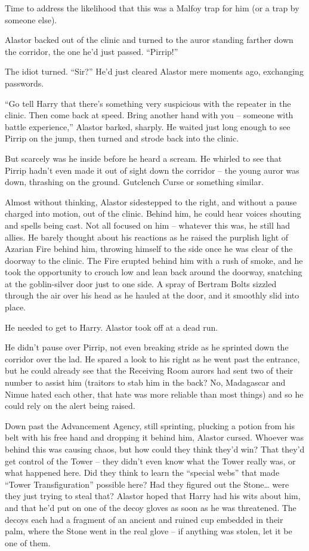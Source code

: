 Time to address the likelihood that this was a Malfoy trap for him (or a
trap by someone else).

Alastor backed out of the clinic and turned to the auror standing
farther down the corridor, the one he'd just passed. ``Pirrip!''

The idiot turned. ``Sir?'' He'd just cleared Alastor mere moments ago,
exchanging passwords.

``Go tell Harry that there's something very suspicious with the repeater
in the clinic. Then come back at speed. Bring another hand with you --
someone with battle experience,'' Alastor barked, sharply. He waited
just long enough to see Pirrip on the jump, then turned and strode back
into the clinic.

But scarcely was he inside before he heard a scream. He whirled to see
that Pirrip hadn't even made it out of sight down the corridor -- the
young auror was down, thrashing on the ground. Gutclench Curse or
something similar.

Almost without thinking, Alastor sidestepped to the right, and without a
pause charged into motion, out of the clinic. Behind him, he could hear
voices shouting and spells being cast. Not all focused on him --
whatever this was, he still had allies. He barely thought about his
reactions as he raised the purplish light of Azarian Fire behind him,
throwing himself to the side once he was clear of the doorway to the
clinic. The Fire erupted behind him with a rush of smoke, and he took
the opportunity to crouch low and lean back around the doorway,
snatching at the goblin-silver door just to one side. A spray of Bertram
Bolts sizzled through the air over his head as he hauled at the door,
and it smoothly slid into place.

He needed to get to Harry. Alastor took off at a dead run.

He didn't pause over Pirrip, not even breaking stride as he sprinted
down the corridor over the lad. He spared a look to his right as he went
past the entrance, but he could already see that the Receiving Room
aurors had sent two of their number to assist him (traitors to stab him
in the back? No, Madagascar and Nimue hated each other, that hate was
more reliable than most things) and so he could rely on the alert being
raised.

Down past the Advancement Agency, still sprinting, plucking a potion
from his belt with his free hand and dropping it behind him, Alastor
cursed. Whoever was behind this was causing chaos, but how could they
think they'd win? That they'd get control of the Tower -- they didn't
even know what the Tower really was, or what happened here. Did they
think to learn the ``special webs'' that made ``Tower Transfiguration''
possible here? Had they figured out the Stone\ldots{} were they just
trying to steal that? Alastor hoped that Harry had his wits about him,
and that he'd put on one of the decoy gloves as soon as he was
threatened. The decoys each had a fragment of an ancient and ruined cup
embedded in their palm, where the Stone went in the real glove -- if
anything was stolen, let it be one of them.

